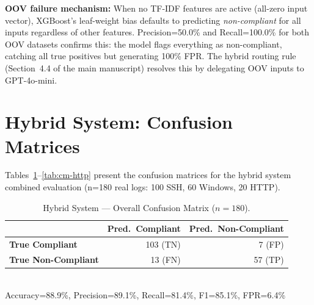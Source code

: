 \documentclass[11pt,a4paper]{article}
\begin{document}
\begin{table}[H]
\centering
\caption{Cross-Dataset Generalization — Full Metrics. OOV = out-of-vocabulary (zero TF-IDF activation).}
\label{tab:generalization-detail}
\setlength{\tabcolsep}{4pt}
\end{table}

\noindent\textbf{OOV failure mechanism:} When no TF-IDF features are active (all-zero input
vector), XGBoost's leaf-weight bias defaults to predicting \textit{non-compliant} for all
inputs regardless of other features. Precision=50.0\% and Recall=100.0\% for both OOV
datasets confirms this: the model flags everything as non-compliant, catching all true
positives but generating 100\% FPR. The hybrid routing rule (Section~4.4 of the main
manuscript) resolves this by delegating OOV inputs to GPT-4o-mini.

\section{Hybrid System: Confusion Matrices}
\label{sec:confusion-matrices}

Tables~\ref{tab:cm-overall}--\ref{tab:cm-http} present the confusion matrices for the hybrid
system combined evaluation (n=180 real logs: 100 SSH, 60 Windows, 20 HTTP).

\begin{table}[H]
\centering
\caption{Hybrid System — Overall Confusion Matrix ($n=180$).}
\label{tab:cm-overall}
\begin{tabular}{lrr}
\toprule
& \textbf{Pred.\ Compliant} & \textbf{Pred.\ Non-Compliant} \\
\midrule
\textbf{True Compliant}     & 103 (TN) &   7 (FP) \\
\textbf{True Non-Compliant} &  13 (FN) &  57 (TP) \\
\bottomrule
\end{tabular}\\[2pt]
\small Accuracy=88.9\%, Precision=89.1\%, Recall=81.4\%, F1=85.1\%, FPR=6.4\%
\end{table}
\end{document}
